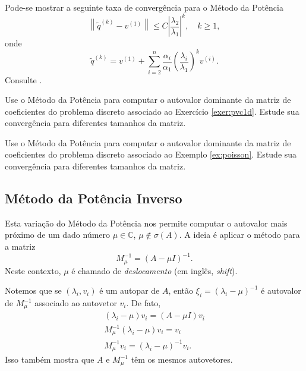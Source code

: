 \begin{obs}
  Pode-se mostrar a seguinte taxa de convergência para o Método da Potência
  \begin{equation}
    \left\|\tilde{q}^{(k)}-v^{(1)}\right\| \leq C\left|\frac{\lambda_2}{\lambda_1}\right|^k,\quad k\geq 1,
  \end{equation}
  onde
  \begin{equation}
    \tilde{q}^{(k)} = v^{(1)} + \sum_{i=2}^n \frac{\alpha_i}{\alpha_1}\left(\frac{\lambda_i}{\lambda_1}\right)^kv^{(i)}.
  \end{equation}
  Consulte \cite[Seção 5.3.]{Quarteroni2007a}.
\end{obs}



\begin{exer}
  Use o Método da Potência para computar o autovalor dominante da matriz de coeficientes do problema discreto associado ao Exercício \ref{exer:pvc1d}. Estude sua convergência para diferentes tamanhos da matriz. 
\end{exer}

\begin{exer}
  Use o Método da Potência para computar o autovalor dominante da matriz de coeficientes do problema discreto associado ao Exemplo \ref{ex:poisson}. Estude sua convergência para diferentes tamanhos da matriz. 
\end{exer}

\subsection{Método da Potência Inverso}
\badgeRevisar

Esta variação do Método da Potência nos permite computar o autovalor mais próximo de um dado número $\mu\in\mathbb{C}$, $\mu\not\in\sigma(A)$. A ideia é aplicar o método para a matriz
\begin{equation}
  M_\mu^{-1} = (A-\mu I)^{-1}.
\end{equation}
Neste contexto, $\mu$ é chamado de \emph{deslocamento} (em inglês, {\it shift}).

Notemos que se $(\lambda_i, v_i)$ é um autopar de $A$, então $\xi_i=(\lambda_i-\mu)^{-1}$ é autovalor de $M_\mu^{-1}$ associado ao autovetor $v_i$. De fato,
\begin{gather}
  (\lambda_i - \mu) v_i = (A-\mu I)v_i\\
  M_\mu^{-1}(\lambda_i-\mu)v_i = v_i\\
  M_\mu^{-1}v_i = (\lambda_i-\mu)^{-1}v_i.
\end{gather}
Isso também mostra que $A$ e $M_\mu^{-1}$ têm os mesmos autovetores.

